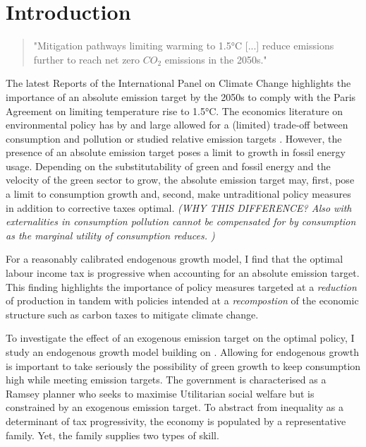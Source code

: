 \section{Introduction}

\begin{quote}
"Mitigation pathways limiting warming to 1.5°C [...]  reduce emissions further to reach net zero $CO_2$ emissions in the 2050s."
\end{quote}

The latest Reports of the International Panel on Climate Change highlights the importance of an absolute emission target by the 2050s to comply with the Paris Agreement on limiting temperature rise to 1.5°C. 
The economics literature on environmental policy has by and large allowed for a (limited) trade-off between consumption and pollution \citep{Barrage2019OptimalPolicy, Golosov2014OptimalEquilibrium} or studied relative emission targets \citep{Fried2018ClimateAnalysis}. 
However, the presence of an absolute emission target poses a limit to growth in fossil energy usage.
Depending on the substitutability of green and fossil energy and the velocity of the green sector to grow, the absolute emission target may, first, pose a limit to consumption growth and, second, make untraditional policy measures in addition to corrective taxes optimal.\textit{ (WHY THIS DIFFERENCE? Also with externalities in consumption pollution cannot be compensated for by consumption as the marginal utility of consumption reduces.  )} 

For a reasonably calibrated endogenous growth model, I find that the optimal labour income tax is progressive when accounting for an absolute emission target. This finding highlights the importance of policy measures targeted at a \textit{reduction} of production in tandem with policies intended at a \textit{recompostion} of the economic structure such as carbon taxes to mitigate climate change. %

To investigate the effect of an exogenous emission target on the optimal policy, I study an endogenous growth model building on \cite{Fried2018ClimateAnalysis}. Allowing for endogenous growth is important to take seriously the possibility of green growth to keep consumption high while meeting emission targets. The government is characterised as a Ramsey planner who seeks to maximise Utilitarian social welfare but is constrained by an exogenous emission target. To abstract from inequality as a determinant of tax progressivity, the economy is populated by a representative family. Yet, the family supplies two types of skill. 

